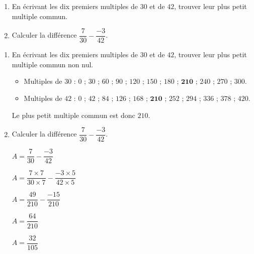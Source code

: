 \begin{exercice*}
    \begin{enumerate}
        \item En écrivant les dix premiers multiples de $30$ et de $42$, trouver leur plus petit multiple commun.
        \smallskip
        \item Calculer la différence $\dfrac{7}{30}-\dfrac{-3}{42}$.
    \end{enumerate}
\end{exercice*}
\begin{corrige}
    \begin{enumerate}
        \item En écrivant les dix premiers multiples de $30$ et de $42$, trouver leur plus petit multiple commun non nul.
        
        \begin{itemize}
            \item Multiples de $30$ : $0$ ; $30$ ; $60$ ; $90$ ; $120$ ; $150$ ; $180$ ; $\mathbf{210}$ ; $240$ ; $270$ ; $300$.
            \item Multiples de $42$ : $0$ ; $42$ ; $84$ ; $126$ ; $168$ ; $\mathbf{210}$ ; $252$ ; $294$ ; $336$ ; $378$ ; $420$.
        \end{itemize}

        Le plus petit multiple commun est donc $210$.

        \smallskip
        \item Calculer la différence $\dfrac{7}{30}-\dfrac{-3}{42}$.
        
        \begin{spacing}{2}
            $A = \dfrac{7}{30}-\dfrac{-3}{42}$

            $A = \dfrac{7\times 7}{30\times 7}-\dfrac{-3\times 5}{42\times 5}$
            
            $A = \dfrac{49}{210}-\dfrac{-15}{210}$

            $A = \dfrac{64}{210}$

            $A = \dfrac{32}{105}$
        \end{spacing}
    \end{enumerate}

\end{corrige}

